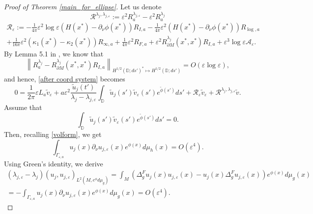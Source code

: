 \documentclass[12pt,a4paper]{amsart}
\numberwithin{equation}{section}
\theoremstyle{plain}
\theoremstyle{definition}
\newcommand{\D}{\mathbb{D}}
\begin{document}
\begin{proof}[Proof of Theorem \ref{main_for_ellipse}]
	Let us denote 
	\begin{equation*}
		\mathcal{R}^{\lambda_j,\lambda_{j,\varepsilon}} := \varepsilon^2 R_a^{\lambda_{j,\varepsilon}} - \varepsilon^2 R_a^{\lambda_{j}} 
	\end{equation*}
	\begin{multline*}
		\mathcal{R}_\varepsilon := - \frac{1}{4\pi} \varepsilon^2\log\varepsilon(H(x^*)-\partial_{\nu}\phi(x^*)) R_{I,a} - \frac{1}{4\pi} \varepsilon^2 (H(x^*)-\partial_{\nu}\phi(x^*))R_{\log,a} \\
		+ \frac{1}{16\pi} \varepsilon^2(\kappa_1(x^*) - \kappa_2(x^*)) R_{\infty,a} + \frac{1}{4\pi} \varepsilon ^2 R_{F,a} + \varepsilon^2 R^{\lambda_j}_{\partial M}(x^*,x^*)R_{I,a} + \varepsilon^3\log\varepsilon\mathcal{A}_\varepsilon.
	\end{multline*}
	By Lemma 5.1 in \cite{NursultanovTzouTzou}, we know that 
	\begin{equation*}
		\left\| R_a^{\lambda_{j}}  -  R^{\lambda_j}_{\partial M}(x^*,x^*)R_{I,a}\right\|_{H^{1/2}(\D; ds')^* \mapsto H^{1/2}(\D; ds')} = O(\varepsilon \log \varepsilon),
	\end{equation*}
	and hence, \eqref{after coord system} becomes
	\begin{equation}\label{LUR}
		0 = \frac{1}{2\pi} \varepsilon L_a\tilde{v}_\varepsilon + a\varepsilon^2\frac{\tilde{u}_j(t')}{\lambda_j - \lambda_{j,\varepsilon}} \int_{\mathbb{D}} \tilde{u}_j(s')\tilde{v}_\varepsilon(s')e^{\tilde{\phi}(s')}ds' + \mathcal{R}_\varepsilon \tilde{v}_\varepsilon + \mathcal{R}^{\lambda_j,\lambda_{j,\varepsilon}}\tilde{v}.
	\end{equation}
	Assume that
	\begin{equation}\label{assumption psi zero}
		\int_{\mathbb{D}} \tilde{u}_j(s')\tilde{v}_\varepsilon(s')e^{\tilde{\phi}(s')}ds' = 0.
	\end{equation}
	Then, recalling \eqref{volform}, we get
	\begin{equation*}
		\int_{\Gamma_{\varepsilon, a}} u_j(x) \partial_{\nu}u_{j,\varepsilon}(x) e^{\phi(x)}d\mu_h(x) = O(\varepsilon^4).
	\end{equation*}
	Using Green's identity, we derive
	\begin{multline*}
		(\lambda_{j,\varepsilon} - \lambda_j)(u_j, u_{j,\varepsilon})_{L^2(M,e^\phi d\mu_g)} = \int_{M} (\Delta_g^F u_j(x)u_{j,\varepsilon}(x) -  u_j(x) \Delta_g^F u_{j,\varepsilon}(x)) e^{\phi(x)} d\mu_g(x) \\
		= - \int_{\Gamma_{\varepsilon, a}} u_j(x) \partial_\nu u_{j,\varepsilon}(x) e^{\phi(x)} d\mu_g(x) = O(\varepsilon^4).

\end{multline*}
\end{proof}
\end{document}
